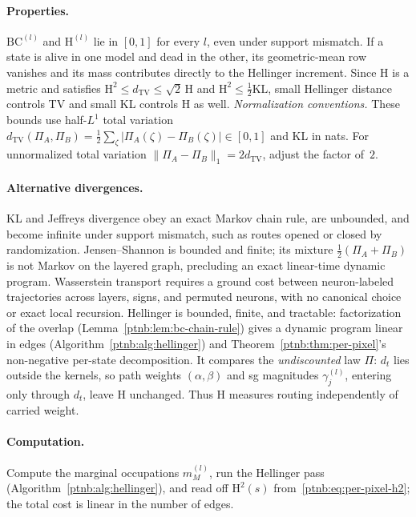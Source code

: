 \paragraph{Properties.}
$\mathrm{BC}^{(l)}$ and $\mathrm{H}^{(l)}$ lie in $[0,1]$ for every $l$, even under support
mismatch.  If a state is alive in one model and dead in the other, its geometric-mean row vanishes
and its mass contributes directly to the Hellinger increment.  Since $\mathrm{H}$ is a metric and
satisfies $\mathrm{H}^2 \le d_{\mathrm{TV}} \le \sqrt{2}\,\mathrm{H}$ and $\mathrm{H}^2 \le
    \tfrac{1}{2}\mathrm{KL}$, small Hellinger distance controls TV and small KL controls H as well.
\emph{Normalization conventions.} These bounds use half-$L^1$ total variation
$d_{\mathrm{TV}}(\Pi_A, \Pi_B) = \tfrac{1}{2}\sum_{\zeta}
    |\Pi_A(\zeta)-\Pi_B(\zeta)| \in [0,1]$ and KL in nats.
For unnormalized total variation $\|\Pi_A-\Pi_B\|_1 = 2 d_{\mathrm{TV}}$, adjust the
factor of~$2$.

\paragraph{Alternative divergences.}\label{ptnb:app:why-hellinger}
KL and Jeffreys divergence obey an exact Markov chain rule, are unbounded, and become
infinite under support mismatch, such as routes opened or closed by randomization.
Jensen--Shannon is bounded and finite; its mixture $\tfrac{1}{2}(\Pi_A+\Pi_B)$ is
not Markov on the layered graph, precluding an exact linear-time dynamic program.
Wasserstein transport requires a ground cost between neuron-labeled trajectories
across layers, signs, and permuted neurons, with no canonical choice or exact local recursion. Hellinger is bounded,
finite, and tractable: factorization of the overlap (Lemma~\ref{ptnb:lem:bc-chain-rule})
gives a dynamic program linear in edges (Algorithm~\ref{ptnb:alg:hellinger}) and
Theorem~\ref{ptnb:thm:per-pixel}'s non-negative per-state decomposition.
It compares the \emph{undiscounted} law $\Pi$: $d_t$ lies outside the kernels, so
path weights $(\alpha,\beta)$ and \ac{sg} magnitudes $\gamma^{(l)}_j$, entering only
through $d_t$, leave $\mathrm{H}$ unchanged. Thus $\mathrm{H}$ measures routing
independently of carried weight.

\paragraph{Computation.}
Compute the marginal occupations $m_M^{(l)}$, run the Hellinger pass
(Algorithm~\ref{ptnb:alg:hellinger}), and read off $\mathrm{H}^2(s)$ from~\eqref{ptnb:eq:per-pixel-h2}; the
total cost is linear in the number of edges.

